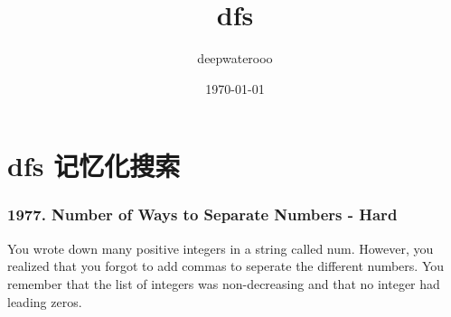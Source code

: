 \documentclass[9pt, b5paaper]{book}
\author{deepwaterooo}
\date{\today}
\title{dfs}
\begin{document}
\maketitle
\tableofcontents


\chapter{dfs 记忆化搜索}
\label{sec-1}
\subsection{1977. Number of Ways to Separate Numbers - Hard}
\label{sec-1-0-1}
You wrote down many positive integers in a string called num. However, you realized that you forgot to add commas to seperate the different numbers. You remember that the list of integers was non-decreasing and that no integer had leading zeros.
\end{document}
